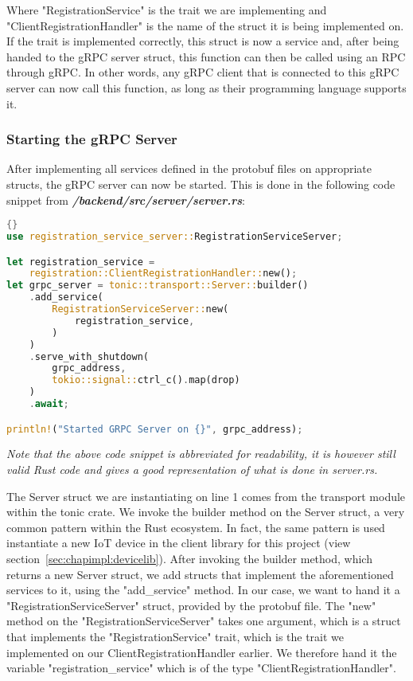 Where "RegistrationService" is the trait we are implementing and "ClientRegistrationHandler" is the name of the struct it is being implemented on. If the trait is implemented correctly, this struct is now a service and, after being handed to the gRPC server struct, this function can then be called using an RPC through gRPC. In other words, any gRPC client that is connected to this gRPC server can now call this function, as long as their programming language supports it.

\subsubsection{Starting the gRPC Server}
After implementing all services defined in the protobuf files on appropriate structs, the gRPC server can now be started. This is done in the following code snippet from \textit{\textbf{/backend/src/server/server.rs}}:
\begin{lstlisting}[language=Rust, style=boxed, showstringspaces=false]{}
use registration_service_server::RegistrationServiceServer;

let registration_service =
    registration::ClientRegistrationHandler::new();
let grpc_server = tonic::transport::Server::builder()
    .add_service(
        RegistrationServiceServer::new(
            registration_service,
        )
    )
    .serve_with_shutdown(
        grpc_address,
        tokio::signal::ctrl_c().map(drop)
    )
    .await;

println!("Started GRPC Server on {}", grpc_address);
\end{lstlisting}
\textit{Note that the above code snippet is abbreviated for readability, it is however still valid Rust code and gives a good representation of what is done in server.rs.} 

The Server struct we are instantiating on line 1 comes from the transport module within the tonic crate. We invoke the builder method on the Server struct, a very common pattern within the Rust ecosystem. In fact, the same pattern is used instantiate a new IoT device in the client library for this project (view section~\ref{sec:chapimpl:devicelib}). After invoking the builder method, which returns a new Server struct, we add structs that implement the aforementioned services to it, using the "add\_service" method. In our case, we want to hand it a "RegistrationServiceServer" struct, provided by the protobuf file. The "new" method on the "RegistrationServiceServer" takes one argument, which is a struct that implements the "RegistrationService" trait, which is the trait we implemented on our ClientRegistrationHandler earlier. We therefore hand it the variable "registration\_service" which is of the type "ClientRegistrationHandler".

